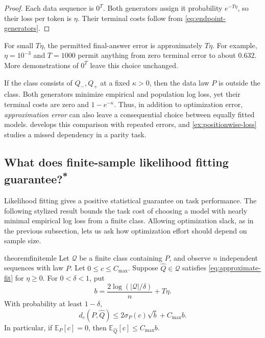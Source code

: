 \documentclass[11pt,twoside]{article}
\newcommand{\E}{\mathbb E}
\newcommand{\suppmark}{\texorpdfstring{\textsuperscript{*}}{*}}
\theoremstyle{definition}
\theoremstyle{remark}
\begin{document}
\begin{proof}
Each data sequence is \(0^T\). Both generators assign it probability
\(e^{-T\eta}\), so their loss per token is \(\eta\).
Their terminal costs follow from \cref{eq:endpoint-generators}.
\end{proof}

For small \(T\eta\), the permitted final-answer error is approximately
\(T\eta\). For example, \(\eta=10^{-3}\) and \(T=1000\) permit
anything from zero terminal error to about \(0.632\).
More demonstrations of \(0^T\) leave this choice unchanged.

If the class consists of \(Q_-,Q_+\) at a fixed \(\kappa>0\), then
the data law \(P\) is outside the class. Both generators minimize
empirical and population log loss, yet their terminal costs are zero
and \(1-e^{-\kappa}\). Thus, in addition to optimization error,
\emph{approximation error} can also leave a
consequential choice between equally fitted models.
 develops this comparison with repeated
errors, and \cref{ex:positionwise-loss} studies a missed dependency
in a parity task.

\subsection{What does finite-sample likelihood fitting guarantee?\suppmark}
\label{sec:finite-class-fitting}

Likelihood fitting gives a positive statistical guarantee
on task performance.
The following stylized result bounds the task cost of choosing a model
with nearly minimal empirical log loss from a finite class.
Allowing optimization slack, as in the previous subsection, lets us ask
how optimization effort should depend on sample size.

\begin{restatable}{theorem}{finitemle}
\label{thm:finite-mle}
Let \(\mathcal Q\) be a finite class containing \(P\), and observe
\(n\) independent sequences with law \(P\).
Let \(0\le c\le C_{\max}\).
Suppose \(\widehat Q\in\mathcal Q\) satisfies
\cref{eq:approximate-fit} for \(\eta\ge0\).
For \(0<\delta<1\), put
\[
 b=\frac{2\log(|\mathcal Q|/\delta)}n+T\eta.
\]
With probability at least \(1-\delta\),
\begin{equation}
 d_c(P,\widehat Q)\le2\sigma_P(c)\sqrt b+C_{\max}b.
 \label{eq:finite-mle}
\end{equation}
In particular, if \(\E_P[c]=0\), then
\(\E_{\widehat Q}[c]\le C_{\max}b\).
\end{restatable}
\end{document}
